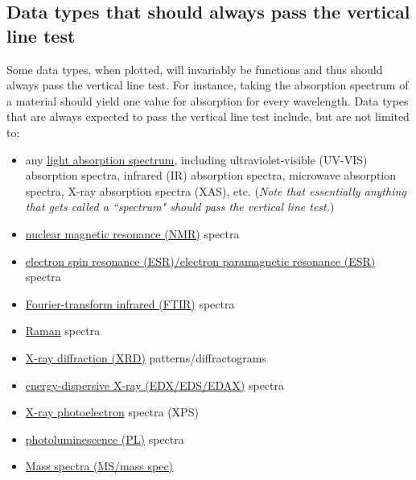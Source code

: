 \documentclass[letterpaper, 12pt]{article}
\begin{document}
\pagebreak

\subsection*{Data types that should always pass the vertical line test}

Some data types, when plotted, will invariably be functions and thus should always pass the vertical line test. For instance, taking the absorption spectrum of a material should yield one value for absorption for every wavelength. Data types that are always expected to pass the vertical line test include, but are not limited to:

\begin{itemize}
    \setlength\itemsep{-0.5em}
    \item any \href{https://en.wikipedia.org/wiki/Absorption_spectroscopy}{light absorption spectrum}, including ultraviolet-visible (UV-VIS) absorption spectra, infrared (IR) absorption spectra, microwave absorption spectra, X-ray absorption spectra (XAS), etc. (\textit{Note that essentially anything that gets called a ``spectrum" should pass the vertical line test.})
    \item \href{https://en.wikipedia.org/wiki/Nuclear_magnetic_resonance_spectroscopy}{nuclear magnetic resonance (NMR)} spectra
    \item \href{https://en.wikipedia.org/wiki/Electron_paramagnetic_resonance}{electron spin resonance (ESR)/electron paramagnetic resonance (ESR)} spectra
    \item \href{https://en.wikipedia.org/wiki/Fourier-transform_infrared_spectroscopy}{Fourier-transform infrared (FTIR)} spectra
    \item \href{https://en.wikipedia.org/wiki/Raman_spectroscopy}{Raman} spectra
    \item \href{https://en.wikipedia.org/wiki/X-ray_diffraction}{X-ray diffraction (XRD)} patterns/diffractograms
    \item \href{https://en.wikipedia.org/wiki/Energy-dispersive_X-ray_spectroscopy}{energy-dispersive X-ray (EDX/EDS/EDAX)} spectra
    \item \href{https://en.wikipedia.org/wiki/X-ray_photoelectron_spectroscopy}{X-ray photoelectron} spectra (XPS)
    \item \href{https://en.wikipedia.org/wiki/Photoluminescence}{photoluminescence (PL)} spectra
    \item \href{https://en.wikipedia.org/wiki/Mass_spectrometry}{Mass spectra (MS/mass spec)}

\end{itemize}
\end{document}
